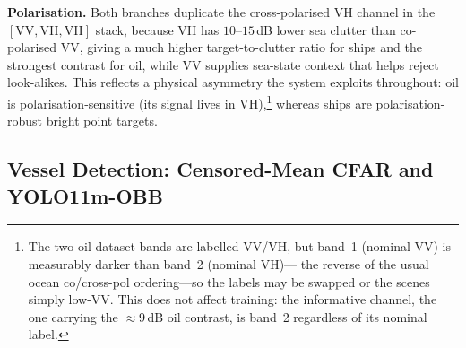 \documentclass[a4paper,11pt]{article}
\begin{document}
\textbf{Polarisation.} Both branches duplicate the cross-polarised VH channel in the
$[\text{VV},\text{VH},\text{VH}]$ stack, because VH has $10$--$15$\,dB lower sea clutter
than co-polarised VV, giving a much higher target-to-clutter ratio for ships and the
strongest contrast for oil, while VV supplies sea-state context that helps reject
look-alikes. This reflects a physical asymmetry the system exploits throughout: oil is
polarisation-sensitive (its signal lives in VH),\footnote{The two oil-dataset bands are
labelled VV/VH, but band~1 (nominal VV) is measurably darker than band~2 (nominal VH)---
the reverse of the usual ocean co/cross-pol ordering---so the labels may be swapped or
the scenes simply low-VV. This does not affect training: the informative channel, the one
carrying the $\approx\!9$\,dB oil contrast, is band~2 regardless of its nominal label.}
whereas ships are polarisation-robust bright point targets.

\subsection{Vessel Detection: Censored-Mean CFAR and YOLO11m-OBB}
\label{subsec:ships}
\end{document}
